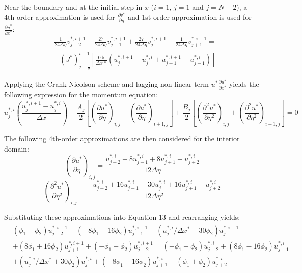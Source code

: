 \documentclass[letterpaper,12pt]{article}
\begin{document}
Near the boundary and at the initial step in $x$ ($i=1$, $j=1$ and $j=N-2$), a 4th-order approximation is used for $\frac{\partial v^*}{\partial \eta}$ and 1st-order approximation is used for $\frac{\partial u^*}{\partial x^*}$:
\begin{equation}
\begin{aligned}
    &\frac{1}{24 \Delta \eta} v_{j-2}^{*,i+1} - \frac{27}{24 \Delta \eta} v_{j-1}^{*,i+1} + \frac{27}{24 \Delta \eta} v_{j}^{*,i+1} - \frac{1}{24 \Delta \eta} v_{j+1}^{*,i+1} = \\
    & - \left(J^* \right)^{i+1}_{j-\frac{1}{2}} \left[ \frac{0.5}{\Delta x*} \left( u_{j}^{*,i+1} - u_{j}^{*,i} + u_{j-1}^{*,i+1} - u_{j-1}^{*,i} \right) \right]
\end{aligned}
\end{equation}

Applying the Crank-Nicolson scheme and lagging non-linear term $u^* \frac{\partial u^*}{\partial x^*}$ yields the following expression for the momentum equation:
\begin{equation}
    u_{j}^{*,i} \left( \frac{u_{j}^{*, i+1} - u_{j}^{*, i}}{\Delta x} \right) + \frac{A_j}{2} \left[ \left( \frac{\partial u^{*}}{\partial \eta} \right)_{i,j} + \left( \frac{\partial u^{*}}{\partial \eta} \right)_{i+1,j} \right] + \frac{B_j}{2} \left[ \left( \frac{\partial^2 u^{*}}{\partial \eta^2} \right)_{i,j} + \left( \frac{\partial^2 u^{*}}{\partial \eta^2} \right)_{i+1,j} \right] = 0
\end{equation}

The following 4th-order approximations are then considered for the interior domain:
\begin{equation}
    \left( \frac{\partial u^{*}}{\partial \eta} \right)_{i,j} = \frac{u_{j-2}^{*,i} - 8 u_{j-1}^{*,i} + 8 u_{j+1}^{*,i} - u_{j+2}^{*,i}}{12 \Delta \eta}
\end{equation}
\begin{equation}
    \left( \frac{\partial^2 u^{*}}{\partial \eta^2} \right)_{i,j} = \frac{-u_{j-2}^{*,i} + 16 u_{j-1}^{*,i} - 30 u_{j}^{*,i} + 16 u_{j+1}^{*,i} - u_{j+2}^{*,i}}{12 \Delta \eta^2}
\end{equation}

Substituting these approximations into Equation 13 and rearranging yields:
\begin{equation}
\begin{aligned}
    &(\phi_1 - \phi_2)u_{j-2}^{*,i+1} + (-8\phi_1 + 16 \phi_2)u_{j-1}^{*,i+1} + (u_{j}^{*,i} / \Delta x^* - 30 \phi_2)u_{j}^{*,i+1} \\
    & + (8\phi_1 + 16 \phi_2)u_{j+1}^{*,i+1} + (-\phi_1 - \phi_2)u_{j+2}^{*,i+1} = (-\phi_1 + \phi_2)u_{j-2}^{*,i} + (8\phi_1 - 16 \phi_2)u_{j-1}^{*,i} \\
    & + (u_{j}^{*,i} / \Delta x^* + 30 \phi_2)u_{j}^{*,i} + (-8\phi_1 - 16 \phi_2)u_{j+1}^{*,i} + (\phi_1 + \phi_2)u_{j+2}^{*,i}
\end{aligned}
\end{equation}
\end{document}
